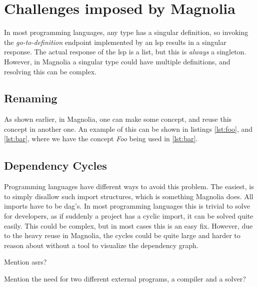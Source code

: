 \section{Challenges imposed by Magnolia}

In most programming languages, any type has a singular definition, so invoking
the \textit{go-to-definition} endpoint implemented by an \gls{lsp} results in a
singular response. The actual response of the \gls{lsp} is a list, but this is
\textit{always} a singleton. However, in Magnolia a singular type could have
multiple definitions, and resolving this can be complex.

\subsection{Renaming}

As shown earlier, in Magnolia, one can make some concept, and reuse this concept
in another one. An example of this can be shown in listings \ref{lst:foo}, and
\ref{lst:bar}, where we have the concept \textit{Foo} being used in \ref{lst:bar}.

\subsection{Dependency Cycles}

Programming languages have different ways to avoid this problem.
The easiest, is to simply disallow such import structures, which is something
Magnolia does. All imports have to be \gls{dag}'s. In most programming languages
this is trivial to solve for developers, as if suddenly a project has a cyclic
import, it can be solved quite easily. This could be complex, but in most cases
this is an easy fix. However, due to the heavy reuse in Magnolia, the cycles
could be quite large and harder to reason about without a tool to visualize the
dependency graph.


Mention \gls{asr}s?

Mention the need for two different external programs, a compiler and a solver?
